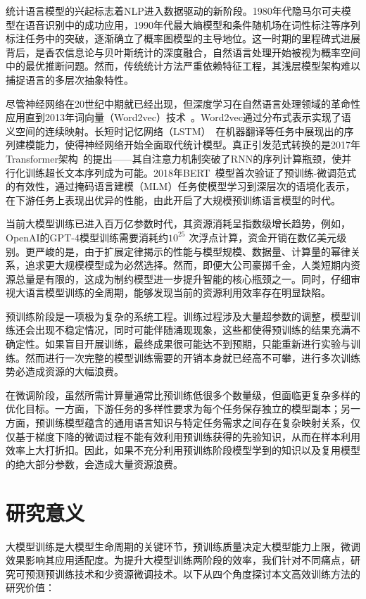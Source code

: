 统计语言模型的兴起标志着NLP进入数据驱动的新阶段。1980年代隐马尔可夫模型在语音识别中的成功应用，1990年代最大熵模型和条件随机场在词性标注等序列标注任务中的突破，逐渐确立了概率图模型的主导地位。这一时期的里程碑式进展背后，是香农信息论与贝叶斯统计的深度融合，自然语言处理开始被视为概率空间中的最优推断问题。然而，传统统计方法严重依赖特征工程，其浅层模型架构难以捕捉语言的多层次抽象特性。

尽管神经网络在20世纪中期就已经出现，但深度学习在自然语言处理领域的革命性应用直到2013年词向量（Word2vec）技术~\cite{mikolov2013efficient}。Word2vec通过分布式表示实现了语义空间的连续映射。长短时记忆网络（LSTM）~\cite{hochreiter1997long}在机器翻译等任务中展现出的序列建模能力，使得神经网络开始全面取代统计模型。真正引发范式转换的是2017年Transformer架构~\cite{Vaswani+2017}的提出——其自注意力机制突破了RNN的序列计算瓶颈，使并行化训练超长文本序列成为可能。2018年BERT~\cite{devlin2018bert}模型首次验证了预训练-微调范式的有效性，通过掩码语言建模（MLM）任务使模型学习到深层次的语境化表示，在下游任务上表现出优异的性能，由此开启了大规模预训练语言模型的时代。

当前大模型训练已进入百万亿参数时代，其资源消耗呈指数级增长趋势，例如，OpenAI的GPT-4模型训练需要消耗约$10^{25}$ 次浮点计算，资金开销在数亿美元级别。更严峻的是，由于扩展定律揭示的性能与模型规模、数据量、计算量的幂律关系，追求更大规模模型成为必然选择。然而，即便大公司豪掷千金，人类短期内资源总量是有限的，这成为制约模型进一步提升智能的核心瓶颈之一。同时，仔细审视大语言模型训练的全周期，能够发现当前的资源利用效率存在明显缺陷。

预训练阶段是一项极为复杂的系统工程。训练过程涉及大量超参数的调整，模型训练还会出现不稳定情况，同时可能伴随涌现现象，这些都使得预训练的结果充满不确定性。如果盲目开展训练，最终成果很可能达不到预期，只能重新进行实验与训练。然而进行一次完整的模型训练需要的开销本身就已经高不可攀，进行多次训练势必造成资源的大幅浪费。

在微调阶段，虽然所需计算量通常比预训练低很多个数量级，但面临更复杂多样的优化目标。一方面，下游任务的多样性要求为每个任务保存独立的模型副本；另一方面，预训练模型蕴含的通用语言知识与特定任务需求之间存在复杂映射关系，仅仅基于梯度下降的微调过程不能有效利用预训练获得的先验知识，从而在样本利用效率上大打折扣。因此，如果不充分利用预训练阶段模型学到的知识以及复用模型的绝大部分参数，会造成大量资源浪费。



\section{研究意义}
大模型训练是大模型生命周期的关键环节，预训练质量决定大模型能力上限，微调效果影响其应用适配度。为提升大模型训练两阶段的效率，我们针对不同痛点，研究可预测预训练技术和少资源微调技术。以下从四个角度探讨本文高效训练方法的研究价值：

